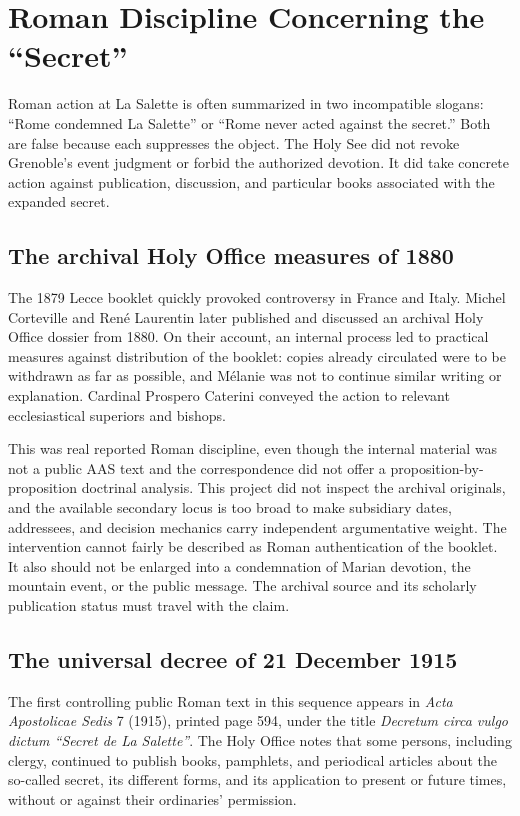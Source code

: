 \section{Roman Discipline Concerning the ``Secret''}

Roman action at La Salette is often summarized in two incompatible slogans: ``Rome condemned La Salette'' or ``Rome never acted against the secret.'' Both are false because each suppresses the object. The Holy See did not revoke Grenoble's event judgment or forbid the authorized devotion. It did take concrete action against publication, discussion, and particular books associated with the expanded secret.

\subsection{The archival Holy Office measures of 1880}

The 1879 Lecce booklet quickly provoked controversy in France and Italy. Michel Corteville and René Laurentin later published and discussed an archival Holy Office dossier from 1880. On their account, an internal process led to practical measures against distribution of the booklet: copies already circulated were to be withdrawn as far as possible, and Mélanie was not to continue similar writing or explanation. Cardinal Prospero Caterini conveyed the action to relevant ecclesiastical superiors and bishops.

This was real reported Roman discipline, even though the internal material was not a public AAS text and the correspondence did not offer a proposition-by-proposition doctrinal analysis. This project did not inspect the archival originals, and the available secondary locus is too broad to make subsidiary dates, addressees, and decision mechanics carry independent argumentative weight. The intervention cannot fairly be described as Roman authentication of the booklet. It also should not be enlarged into a condemnation of Marian devotion, the mountain event, or the public message. The archival source and its scholarly publication status must travel with the claim.

\subsection{The universal decree of 21 December 1915}

The first controlling public Roman text in this sequence appears in \emph{Acta Apostolicae Sedis} 7 (1915), printed page 594, under the title \emph{Decretum circa vulgo dictum ``Secret de La Salette''}. The Holy Office notes that some persons, including clergy, continued to publish books, pamphlets, and periodical articles about the so-called secret, its different forms, and its application to present or future times, without or against their ordinaries' permission.

